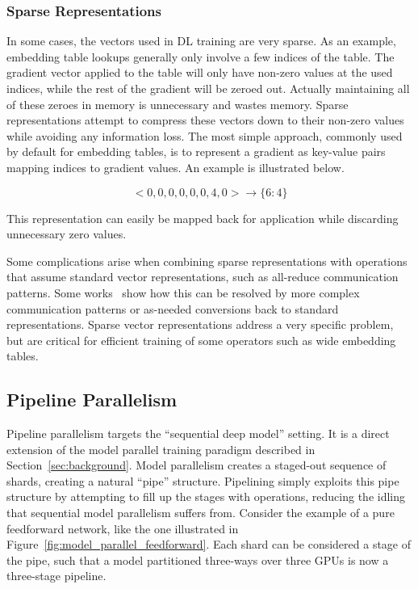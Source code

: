 \subsubsection{Sparse Representations}
In some cases, the vectors used in DL training are very sparse. As an example, embedding table lookups generally only involve a few indices of the table. The gradient vector applied to the table will only have non-zero values at the used indices, while the rest of the gradient will be zeroed out. Actually maintaining all of these zeroes in memory is unnecessary and wastes memory. Sparse representations attempt to compress these vectors down to their non-zero values while avoiding any information loss. The most simple approach, commonly used by default for embedding tables, is to represent a gradient as key-value pairs mapping indices to gradient values. An example is illustrated below.

\[ <0, 0, 0, 0, 0, 0, 4, 0> \rightarrow \{6: 4\} \]

This representation can easily be mapped back for application while discarding unnecessary zero values.

Some complications arise when combining sparse representations with operations that assume standard vector representations, such as all-reduce communication patterns. Some works~\cite{mlplatformmeetup2022} show how this can be resolved by more complex communication patterns or as-needed conversions back to standard representations. Sparse vector representations address a very specific problem, but are critical for efficient training of some operators such as wide embedding tables.

\subsection{Pipeline Parallelism} 
Pipeline parallelism targets the ``sequential deep model'' setting. It is a direct extension of the model parallel training paradigm described in Section~\ref{sec:background}. Model parallelism creates a staged-out sequence of shards, creating a natural ``pipe'' structure. Pipelining simply exploits this pipe structure by attempting to fill up the stages with operations, reducing the idling that sequential model parallelism suffers from. Consider the example of a pure feedforward network, like the one illustrated in Figure~\ref{fig:model_parallel_feedforward}. Each shard can be considered a stage of the pipe, such that a model partitioned three-ways over three GPUs is now a three-stage pipeline.

